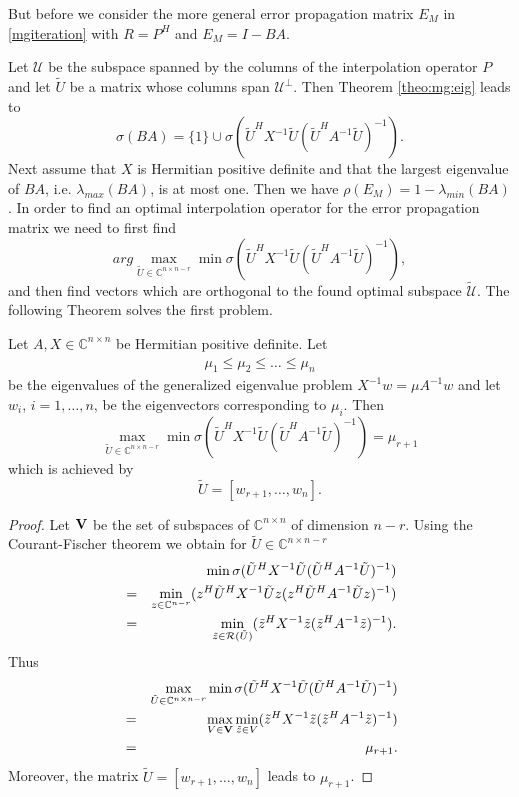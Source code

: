 \documentclass[final]{amsart}
\newcommand{\innCnn}{\in\mathbb{C}^{n\times n}}
\newcommand{\innbCnnmr}{\in\mathbb{C}^{n\times n-r}}
\newcommand{\innCnmr}{\in\mathbb{C}^{n-r}}
\newcommand{\U}{\mathcal{U}}
\newcommand{\beqo}{\begin{eqnarray*}}
\newcommand{\beq}{\begin{eqnarray}}
\newcommand{\eeqo}{\end{eqnarray*}}
\newcommand{\eeq}{\end{eqnarray}}
\numberwithin{equation}{section}
\newcommand{\ran} {{\cal R}}
\newcommand{\Cnn}{\mathbb{C}^{n \times n}}
\begin{document}
But before  we consider  the  more general error propagation matrix $E_M$ in
\eqref{mgiteration} with $R= P^H$  and  $E_{M} = I - BA$.



Let $\U $ be the subspace spanned  by the columns of the interpolation operator
$P$ and let $\tilde U$ be a matrix whose  columns span  $\U ^\perp$. Then
Theorem \ref{theo:mg:eig}  leads to
\[
\sigma (BA) = \{1\} \cup \sigma(\tilde U^HX^{-1}\tilde U (\tilde
U^HA^{-1}\tilde U)^{-1}).
\]
Next assume that $X$ is Hermitian positive definite and that the largest
eigenvalue of $BA$, i.e. $\lambda_{max}(BA)$,  is at most one. Then we have
$\rho(E_M) = 1 - \lambda_{min}(BA)$. In order to find an optimal interpolation
operator for the error propagation matrix  we need  to first find
\[
arg \max_{\tilde U \innbCnnmr} \min \sigma(\tilde U^HX^{-1}\tilde U (\tilde
U^HA^{-1}\tilde U)^{-1}),
\]
and then find vectors which are orthogonal to the found optimal subspace
$\mathcal{\tilde U}$.
The following Theorem  solves the   first  problem.

\begin{theorem} \label{theo:main}
Let $A, X \innCnn$ be Hermitian positive definite. Let 
\beq
\mu_1 \leq \mu_2 \leq \ldots \leq  \mu_n 
\eeq
be the  eigenvalues of the generalized eigenvalue problem $X^{-1}w = \mu
A^{-1}w$ and let $w_i$, $i = 1, \ldots, n$, be the eigenvectors corresponding
to $\mu_i$. Then
\[
\max_{\tilde U \innbCnnmr} \min \sigma(\tilde U^HX^{-1}\tilde U (\tilde
U^HA^{-1}\tilde U)^{-1}) = \mu_{r+1}
\]
which is achieved by 
\[
\tilde U = [w_{r+1}, \ldots, w_n].
\] 
\end{theorem}
\begin{proof}
Let ${\bf V}$ be the set of subspaces of $\Cnn$ of dimension $n-r$. Using the
Courant-Fischer theorem we obtain for $\tilde U \innbCnnmr$
\beqo
& &  \min \sigma(\tilde U^HX^{-1}\tilde U (\tilde U^HA^{-1}\tilde U)^{-1})\\
& = &  \min_{z \innCnmr} (z^H\tilde U^HX^{-1}\tilde Uz (z^H\tilde
U^HA^{-1}\tilde Uz)^{-1})\\
& = &  \min_{\tilde z \in {\ran (\tilde U)} } (\tilde z^HX^{-1}\tilde z (\tilde
z^HA^{-1}\tilde z)^{-1}).
\eeqo
Thus
\beqo
& &  \max_{\tilde U \innbCnnmr} \min \sigma(\tilde U^HX^{-1}\tilde U (\tilde
U^HA^{-1}\tilde U)^{-1})\\
& = & \max_{V  \in {\bf V}} \min_{\tilde z \in V} (\tilde z^HX^{-1}\tilde z
(\tilde z^HA^{-1}\tilde z)^{-1})\\
&  = & \mu_{r+1}.
\eeqo
Moreover, the matrix $\tilde U = [w_{r+1}, \ldots, w_n]$ leads  to $\mu_{r+1}$.
\end{proof}
\end{document}
